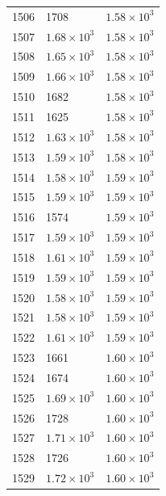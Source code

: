 \begin{table}[H]
\begin{tabular}{lll}
1506 & 1708 & $\displaystyle 1.58 \times 10^{3}$ \\
1507 & $\displaystyle 1.68 \times 10^{3}$ & $\displaystyle 1.58 \times 10^{3}$ \\
1508 & $\displaystyle 1.65 \times 10^{3}$ & $\displaystyle 1.58 \times 10^{3}$ \\
1509 & $\displaystyle 1.66 \times 10^{3}$ & $\displaystyle 1.58 \times 10^{3}$ \\
1510 & 1682 & $\displaystyle 1.58 \times 10^{3}$ \\
1511 & 1625 & $\displaystyle 1.58 \times 10^{3}$ \\
1512 & $\displaystyle 1.63 \times 10^{3}$ & $\displaystyle 1.58 \times 10^{3}$ \\
1513 & $\displaystyle 1.59 \times 10^{3}$ & $\displaystyle 1.58 \times 10^{3}$ \\
1514 & $\displaystyle 1.58 \times 10^{3}$ & $\displaystyle 1.59 \times 10^{3}$ \\
1515 & $\displaystyle 1.59 \times 10^{3}$ & $\displaystyle 1.59 \times 10^{3}$ \\
1516 & 1574 & $\displaystyle 1.59 \times 10^{3}$ \\
1517 & $\displaystyle 1.59 \times 10^{3}$ & $\displaystyle 1.59 \times 10^{3}$ \\
1518 & $\displaystyle 1.61 \times 10^{3}$ & $\displaystyle 1.59 \times 10^{3}$ \\
1519 & $\displaystyle 1.59 \times 10^{3}$ & $\displaystyle 1.59 \times 10^{3}$ \\
1520 & $\displaystyle 1.58 \times 10^{3}$ & $\displaystyle 1.59 \times 10^{3}$ \\
1521 & $\displaystyle 1.58 \times 10^{3}$ & $\displaystyle 1.59 \times 10^{3}$ \\
1522 & $\displaystyle 1.61 \times 10^{3}$ & $\displaystyle 1.59 \times 10^{3}$ \\
1523 & 1661 & $\displaystyle 1.60 \times 10^{3}$ \\
1524 & 1674 & $\displaystyle 1.60 \times 10^{3}$ \\
1525 & $\displaystyle 1.69 \times 10^{3}$ & $\displaystyle 1.60 \times 10^{3}$ \\
1526 & 1728 & $\displaystyle 1.60 \times 10^{3}$ \\
1527 & $\displaystyle 1.71 \times 10^{3}$ & $\displaystyle 1.60 \times 10^{3}$ \\
1528 & 1726 & $\displaystyle 1.60 \times 10^{3}$ \\
1529 & $\displaystyle 1.72 \times 10^{3}$ & $\displaystyle 1.60 \times 10^{3}$ \\

\end{tabular}
\end{table}
